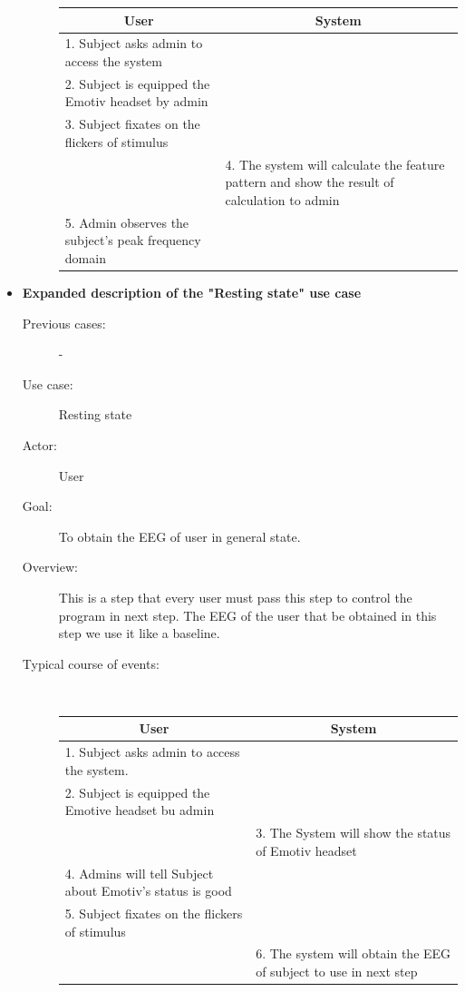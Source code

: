 \begin{itemize}
\begin{description}
	{
		\centering
		
		\begin{tabular}{| m{.47\linewidth} | m{.47\linewidth} |}
			
			\hline 
			\multicolumn{1}{|c}{\textbf{User}} & 
  			\multicolumn{1}{|c|}{\textbf{System}}\\
			\hline 
			1. Subject asks admin to access the system &   \\
			\hline 
			2. Subject is equipped the Emotiv headset by admin  &   \\
			\hline 
			3. Subject fixates on the flickers of stimulus & \\
			\hline 
			& 4. The system will calculate the feature pattern and show the result of calculation to admin  \\
			\hline
			5. Admin observes the subject’s peak frequency domain & \\
			\hline
			
		\end{tabular}
	}
	
\end{description}

\item \textbf{Expanded description of the "Resting state" use case }
\begin{description}
	\item [Previous cases:] -
	\item [Use case:] Resting state
	\item [Actor:] User  
	\item [Goal:] To obtain the EEG of user in general state. 
	\item [Overview:] This is a step that every user must pass this step to control the program in next step. The EEG of the user that be obtained in this step we use it like a baseline. 
	\item [Typical course of events:]~
	
	{
		\centering
		\begin{tabular}{| m{.47\linewidth} | m{.47\linewidth} |}
			
			\hline 
			\multicolumn{1}{|c}{\textbf{User}} & 
  			\multicolumn{1}{|c|}{\textbf{System}}\\
			\hline 
			1. Subject asks admin to access the system. &   \\
			\hline 
			2. Subject is equipped the Emotive headset bu admin   &   \\
			\hline 
			& 3. The System will show the status of Emotiv headset \\
			\hline 
			4. Admins will tell Subject about Emotiv's status is good &  \\
			\hline
			5. Subject fixates on the flickers of stimulus &  \\
			\hline
			& 6. The system will obtain the EEG of subject to use in next step\\
			\hline
			

\end{tabular}}
\end{description}
\end{itemize}
